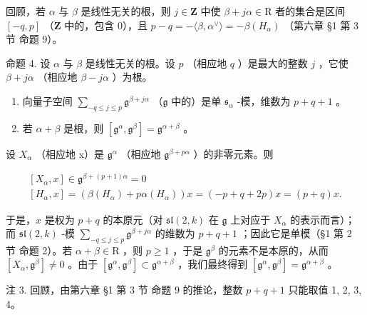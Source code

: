 回顾，若 \(\alpha\) 与 \(\beta\) 是线性无关的根，则 \(j \in \mathbf{Z}\) 中使 \(\beta + j\alpha \in \mathrm{R}\) 者的集合是区间 \([-q, p]\) （\(\mathbf{Z}\) 中的，包含 0），且 \(p - q = -\langle \beta, \alpha^{\vee} \rangle = -\beta(H_{\alpha})\) （第六章 §1 第 3 节 命题 9）。

命题 4. 设 \(\alpha\) 与 \(\beta\) 是线性无关的根。设 \(p\) （相应地 \(q\) ）是最大的整数 \(j\) ，它使 \(\beta + j\alpha\) （相应地 \(\beta - j\alpha\) ）为根。

\begin{enumerate}
\def\labelenumi{(\roman{enumi})}
\item
  向量子空间 \(\sum_{-q\leq j\leq p}\mathfrak{g}^{\beta +j\alpha}\) （\(\mathfrak{g}\) 中的）是单 \(\mathfrak{s}_{\alpha}\) -模，维数为 \(p + q + 1\) 。
\item
  若 \(\alpha + \beta\) 是根，则 \([\mathfrak{g}^{\alpha}, \mathfrak{g}^{\beta}] = \mathfrak{g}^{\alpha + \beta}\) 。
\end{enumerate}

设 \(X_{\alpha}\) （相应地 x）是 \(\mathfrak{g}^{\alpha}\) （相应地 \(\mathfrak{g}^{\beta+p\alpha}\) ）的非零元素。则

\[
\begin{array}{c} {[ X _ {\alpha}, x ] \in \mathfrak {g} ^ {\beta + (p + 1) \alpha} = 0} \\ {[ H _ {\alpha}, x ] = (\beta (H _ {\alpha}) + p \alpha (H _ {\alpha})) x = (- p + q + 2 p) x = (p + q) x.} \end{array}
\]

于是，\(x\) 是权为 \(p + q\) 的本原元（对 \(\mathfrak{sl}(2,k)\) 在 \(\mathfrak{g}\) 上对应于 \(X_{\alpha}\) 的表示而言）；而 \(\mathfrak{sl}(2,k)\) -模 \(\sum_{-q\leq j\leq p}\mathfrak{g}^{\beta +j\alpha}\) 的维数为 \(p + q + 1\) ；因此它是单模（§1 第 2 节 命题 2）。若 \(\alpha +\beta \in \mathrm{R}\) ，则 \(p\geq 1\) ，于是 \(\mathfrak{g}^{\beta}\) 的元素不是本原的，从而 \([X_{\alpha},\mathfrak{g}^{\beta}]\neq 0\) 。由于 \([\mathfrak{g}^{\alpha},\mathfrak{g}^{\beta}]\subset \mathfrak{g}^{\alpha +\beta}\) ，我们最终得到 \([\mathfrak{g}^{\alpha},\mathfrak{g}^{\beta}] = \mathfrak{g}^{\alpha +\beta}\) 。

注 3. 回顾，由第六章 §1 第 3 节 命题 9 的推论，整数 \(p + q + 1\) 只能取值 1, 2, 3, 4。

